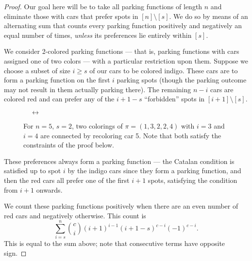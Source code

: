\documentclass[12 pt]{amsart}
\theoremstyle{definition} %
\theoremstyle{remark} %
\newcommand{\mzncar}[3][(0,0)]{
\begin{scope}[shift={#1}]
\shade[top color=#2, bottom color=#3, shading angle=90, draw=white, rounded corners=0.7ex, very thick] (0.75,.25) -- ++(0,0.5) -- ++(0.5,0.15) -- ++(1.5,0) -- ++(0.5,0) -- ++(0,-0.65) -- (0.75,.25) -- cycle;
\draw[thick, rounded corners=0.2ex, fill=white, thick] (1.25,0.85) -- ++(0.5,0.35) -- ++(0.8,0) -- ++(0.3,-0.35) -- (1.25,0.85);
\draw[thick] (2.1,0.85) -- (2.1,1.2);
\draw[fill=gray!80,thin] (1.375,.25) circle[radius=.2];
\draw[fill=gray!80,thin] (2.76,.25) circle[radius=.2];
\end{scope}
}
\begin{document}
\begin{proof}
    Our goal here will be to take all parking functions of length $n$ and eliminate those with cars that prefer spots in $[n] \setminus [s]$. We do so by means of an alternating sum that counts every parking function positively and negatively an equal number of times, \textit{unless} its preferences lie entirely within $[s].$

	We consider 2-colored parking functions --- that is, parking functions with cars assigned one of two colors --- with a particular restriction upon them.  Suppose we choose a subset of size $i \ge s$ of our cars to be colored indigo. These cars are to form a parking function on the first $i$ parking spots (though the parking outcome may not result in them actually parking there). The remaining $n - i$ cars are colored red and can prefer any of the $i + 1 - s$ ``forbidden'' spots in  $[i + 1] \setminus [s]$.
    
\begin{figure}
\begin{center}
 $\quad \longleftrightarrow \quad$
\end{center}
\caption{For $n=5$, $s = 2$, two colorings of $\pi = (1,3,2,2,4)$ with $i = 3$ and $i = 4$ are connected by recoloring car 5. Note that both satisfy the constraints of the proof below.}
\end{figure}
    
    These preferences always form a parking function --- the Catalan condition is satisfied up to spot $i$ by the indigo cars since they form a parking function, and then the red cars all prefer one of the first $i + 1$ spots, satisfying the condition from $i+1$ onwards.
    
    We count these parking functions positively when there are an even number of red cars and negatively otherwise. This count is
	\[
		\sum_{i = s}^{n} \binom{c}{i} (i + 1)^{i - 1} (i + 1 - s)^{c - i} (-1)^{c - i}.
	\]
	This is equal to the sum above; note that consecutive terms have opposite sign.


\end{proof}
\end{document}
